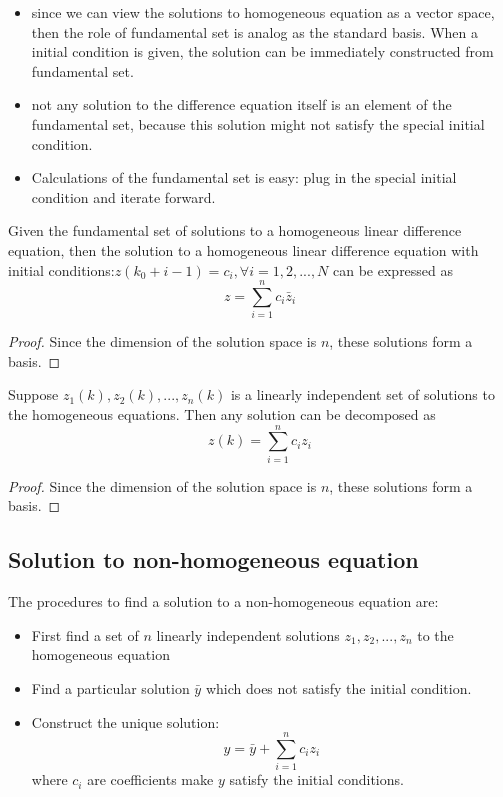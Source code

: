 \begin{refsection}
\begin{remark}\hfill
\begin{itemize}
    \item since we can view the solutions to homogeneous equation as a vector space, then the role of fundamental set is analog as the standard basis. When a initial condition is given, the solution can be immediately constructed from fundamental set.
    \item not any solution to the difference equation itself is an element of the fundamental set, because this solution might not satisfy the special initial condition.
    \item Calculations of the fundamental set is easy: plug in the special initial condition and iterate forward. 
\end{itemize}
\end{remark}


\begin{theorem}
Given the fundamental set of solutions to a homogeneous linear difference equation, then the solution to a homogeneous linear difference equation with initial conditions:$z(k_0+i-1)=c_i,\forall i=1,2,...,N$ can be expressed as 
$$z = \sum_{i=1}^n c_i \bar{z}_i$$
\end{theorem}
\begin{proof}
Since the dimension of the solution space is $n$, these solutions form a basis.
\end{proof}


\begin{theorem}
Suppose $z_1(k),z_2(k),...,z_n(k)$ is a linearly independent set of solutions to the homogeneous equations. Then any solution can be decomposed as
$$z(k) = \sum_{i=1}^n c_i z_i$$
\end{theorem}
\begin{proof}
Since the dimension of the solution space is $n$, these solutions form a basis.
\end{proof}








\subsection{Solution to non-homogeneous equation}
\begin{mdframed}
The procedures to find a solution to a non-homogeneous equation are:\cite{luenberger1979introduction}
\begin{itemize}
    \item First find a set of $n$ linearly independent solutions $z_1,z_2,...,z_n$ to the homogeneous equation
    \item Find a particular solution $\bar{y}$ which does not satisfy the initial condition.
    \item Construct the unique solution:
    $$y = \bar{y} + \sum_{i=1}^n c_i z_i$$
    where $c_i$ are coefficients make $y$ satisfy the initial conditions.
\end{itemize}
\end{mdframed}



\end{refsection}
